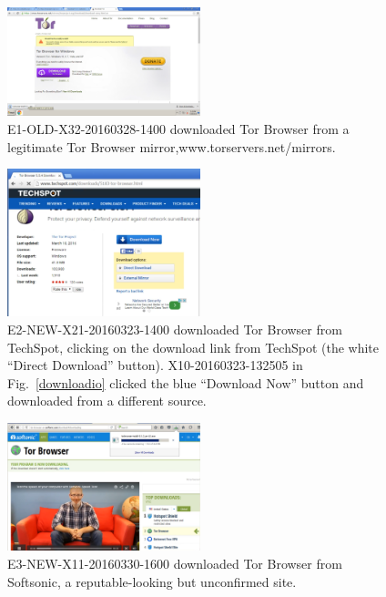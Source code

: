 \documentclass[USenglish,oneside,twocolumn]{article}
\begin{document}
\begin{figure}[h]
\includegraphics[width=0.5\textwidth]{../experiment/processing/bad-participants/X32-20160328-134531-mirror.png}
\caption{E1-OLD-X32-20160328-1400 downloaded Tor Browser from a legitimate Tor Browser mirror,www.torservers.net/mirrors.}
\label{mirror}
\end{figure}

\begin{figure}[h]
\includegraphics[width=0.5\textwidth]{../experiment/processing/bad-participants/20160323-133257-techspot.png}
\caption{E2-NEW-X21-20160323-1400 downloaded Tor Browser from TechSpot, clicking on the download link from 
TechSpot (the white ``Direct Download'' button). X10-20160323-132505 in Fig.~\ref{downloadio} clicked the blue ``Download Now'' button and downloaded from a different source.}
\label{techspot}
\end{figure}

\begin{figure}[h]
\includegraphics[width=0.5\textwidth]{../experiment/processing/bad-participants/20160330-161511-softsonic.png}
\caption{E3-NEW-X11-20160330-1600 downloaded Tor Browser from Softsonic, a reputable-looking but
unconfirmed site.}
\label{softsonic}
\end{figure}
\end{document}
